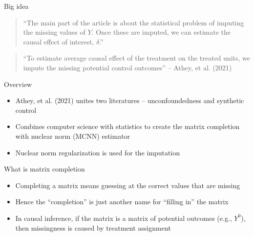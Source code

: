 \documentclass{beamer}
\begin{document}
\begin{frame}{Big idea}

\begin{quote}
``The main part of the article is about the statistical problem of imputing the missing values of $Y$.  Once these are imputed, we can estimate the causal effect of interest, $\delta$.''
\end{quote}

\bigskip

\begin{quote}
``To estimate average causal effect of the treatment on the treated units, we impute the missing potential control outcomes'' -- Athey, et al. (2021)
\end{quote}


\end{frame}

\begin{frame}{Overview}

\begin{itemize}
\item Athey, et al. (2021) unites two literatures -- unconfoundedness and synthetic control
\item Combines computer science with statistics to create the matrix completion with nuclear norm (MCNN) estimator
\item Nuclear norm regularization is used for the imputation
\end{itemize}

\end{frame}

\begin{frame}{What is matrix completion}

\begin{itemize}
\item Completing a matrix means guessing at the correct values that are missing 
\item Hence the ``completion'' is just another name for ``filling in'' the matrix 
\item In causal inference, if the matrix is a matrix of potential outcomes (e.g., $Y^0$), then missingness is caused by treatment assignment
\end{itemize}
\end{frame}
\end{document}
